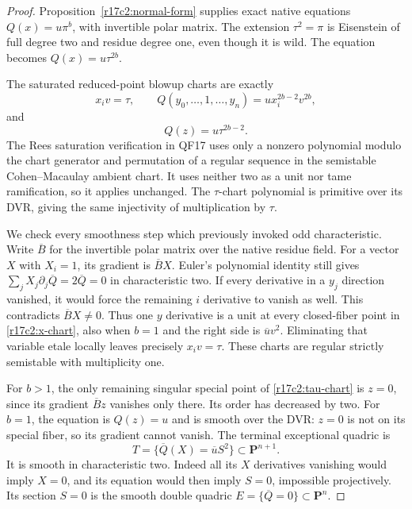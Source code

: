 \begin{proof}
Proposition~\ref{r17c2:normal-form} supplies exact native
equations $Q(x)=u\pi^b$, with invertible polar matrix.
The extension $\tau^2=\pi$ is Eisenstein of full degree
two and residue degree one, even though it is wild.
The equation becomes $Q(x)=u\tau^{2b}$.

The saturated reduced-point blowup charts are exactly
\[
 x_i v=\tau,\qquad
 Q(y_0,\ldots,1,\ldots,y_n)
                          =u x_i^{2b-2}v^{2b},
 \tag{C217.7}\label{r17c2:x-chart}
\]
and
\[
                         Q(z)=u\tau^{2b-2}.
 \tag{C217.8}\label{r17c2:tau-chart}
\]
The Rees saturation verification in QF17 uses only a
nonzero polynomial modulo the chart generator and
permutation of a regular sequence in the semistable
Cohen--Macaulay ambient chart. It uses neither two as a
unit nor tame ramification, so it applies unchanged.
The $\tau$-chart polynomial is primitive over its DVR,
giving the same injectivity of multiplication by $\tau$.

We check every smoothness step which previously invoked
odd characteristic. Write $\overline B$ for the invertible
polar matrix over the native residue field. For a vector
$X$ with $X_i=1$, its gradient is $\overline B X$.
Euler's polynomial identity still gives
$\sum_jX_j\partial_j\overline Q=2\overline Q=0$
in characteristic two. If every derivative in a $y_j$
direction vanished, it would force the remaining $i$
derivative to vanish as well. This contradicts
$\overline B X\ne0$. Thus one $y$ derivative is a unit
at every closed-fiber point in \eqref{r17c2:x-chart},
also when $b=1$ and the right side is $\overline u v^2$.
Eliminating that variable etale locally leaves precisely
$x_i v=\tau$. These charts are regular strictly
semistable with multiplicity one.

For $b>1$, the only remaining singular special point of
\eqref{r17c2:tau-chart} is $z=0$, since its gradient
$\overline Bz$ vanishes only there. Its order has decreased
by two. For $b=1$, the equation is $Q(z)=u$ and is smooth
over the DVR: $z=0$ is not on its special fiber, so its
gradient cannot vanish. The terminal exceptional quadric is
\[
                  T=\{\overline Q(X)=\overline u S^2\}
                                      \subset\mathbf P^{n+1}.
 \tag{C217.9}\label{r17c2:terminal}
\]
It is smooth in characteristic two. Indeed all its
$X$ derivatives vanishing would imply $X=0$, and its
equation would then imply $S=0$, impossible projectively.
Its section $S=0$ is the smooth double quadric
$E=\{\overline Q=0\}\subset\mathbf P^n$.


\end{proof}
